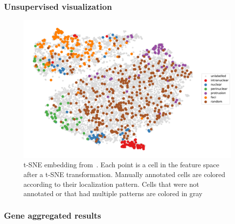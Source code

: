 \subsubsection{Unsupervised visualization}

\begin{figure}[h]
    \centering
    \includegraphics[width=\textwidth]{figures/chapter5/tsne_annotation_legend}
    \caption{t-SNE embedding from~\cite{CHOUAIB_2020}.
	Each point is a cell in the feature space after a t-SNE transformation.
	Manually annotated cells are colored according to their localization pattern.
	Cells that were not annotated or that had multiple patterns are colored in gray}
    \label{fig:tsne_annotation_racha}
\end{figure}

\subsubsection{Gene aggregated results}

